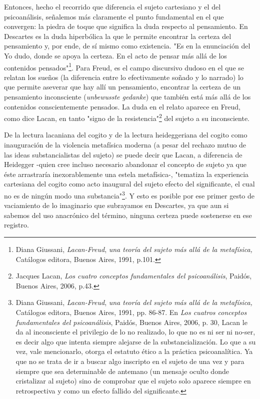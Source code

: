 Entonces, hecho el recorrido que diferencia el sujeto cartesiano y el
del psicoanálisis, señalemos más claramente el punto fundamental en el
que convergen: la piedra de toque que significa la duda respecto al
pensamiento. En Descartes es la duda hiperbólica la que le permite
encontrar la certeza del pensamiento y, por ende, de sí mismo como
existencia. "Es en la enunciación del Yo dudo, donde se apoya la
certeza. En el acto de pensar más allá de los contenidos
pensados"\footnote{Diana Giussani, \emph{Lacan-Freud}, \emph{una teoría
  del sujeto más allá de la metafísica,} Catálogos editora, Buenos
  Aires, 1991, p.101.}. Para Freud, es el campo discursivo dudoso en el
que se relatan los sueños (la diferencia entre lo efectivamente soñado y
lo narrado) lo que permite aseverar que hay allí un pensamiento,
encontrar la certeza de un pensamiento inconsciente (\emph{unbewusste
gedanke}) que también está más allá de los contenidos conscientemente
pensados. La duda en el relato aparece en Freud, como dice Lacan, en
tanto "signo de la resistencia"\footnote{Jacques Lacan, \emph{Los cuatro
  conceptos fundamentales del psicoanálisis}, Paidós, Buenos Aires,
  2006, p.43.} del sujeto a su inconsciente.

De la lectura lacaniana del cogito y de la lectura heideggeriana del
cogito como inauguración de la violencia metafísica moderna (a pesar del
rechazo mutuo de las ideas substancialistas del sujeto) se puede decir
que Lacan, a diferencia de Heidegger -quien cree incluso necesario
abandonar el concepto de sujeto ya que éste arrastraría inexorablemente
una estela metafísica-, "tematiza la experiencia cartesiana del cogito
como acto inaugural del sujeto efecto del significante, el cual no es de
ningún modo una substancia"\footnote{Diana Giussani, \emph{Lacan-Freud},
  \emph{una teoría del sujeto más allá de la metafísica,} Catálogos
  editora, Buenos Aires, 1991, pp. 86-87. En \emph{Los cuatros conceptos
  fundamentales del psicoanálisis}, Paidós, Buenos Aires, 2006, p. 30,
  Lacan le da al inconsciente el privilegio de lo no realizado, lo que
  no es ni ser ni no-ser, es decir algo que intenta siempre alejarse de
  la substancialización. Lo que a su vez, vale mencionarlo, otorga el
  estatuto ético a la práctica psicoanalítica. Ya que no se trata de ir
  a buscar algo inscripto en el sujeto de una vez y para siempre que sea
  determinable de antemano (un mensaje oculto donde cristalizar al
  sujeto) sino de comprobar que el sujeto solo aparece siempre en
  retrospectiva y como un efecto fallido del significante.}. Y esto es
posible por ese primer gesto de vaciamiento de lo imaginario que
subrayamos en Descartes, ya que aun si sabemos del uso anacrónico del
término, ninguna certeza puede sostenerse en ese registro.

